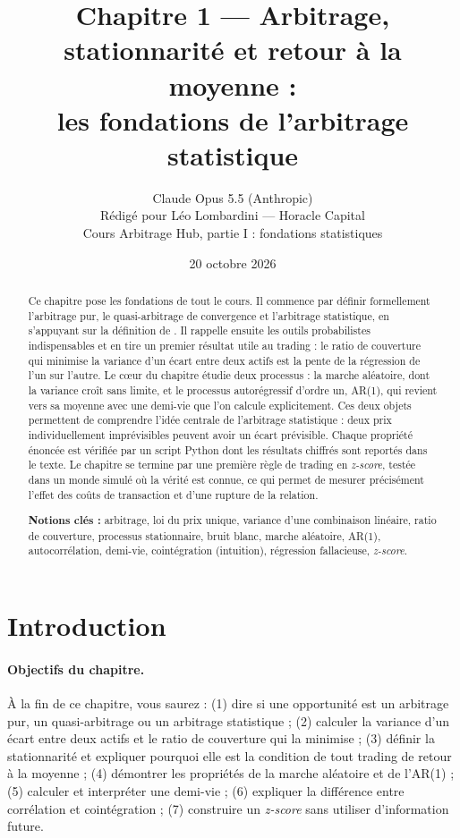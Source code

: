 \documentclass[11pt,a4paper]{article}
\title{\textbf{Chapitre 1 — Arbitrage, stationnarité et retour à la moyenne :\\ les fondations de l'arbitrage statistique}}
\author{Claude Opus 5.5 (Anthropic)\\[0.2em]
\small Rédigé pour Léo Lombardini — Horacle Capital\\
\small Cours \og Arbitrage Hub\fg, partie I : fondations statistiques}
\date{20 octobre 2026}
\begin{document}
\maketitle
\thispagestyle{empty}

\begin{abstract}
\noindent Ce chapitre pose les fondations de tout le cours. Il commence par définir formellement l'arbitrage pur, le quasi-arbitrage de convergence et l'arbitrage statistique, en s'appuyant sur la définition de \citet{hogan2004}. Il rappelle ensuite les outils probabilistes indispensables et en tire un premier résultat utile au trading : le ratio de couverture qui minimise la variance d'un écart entre deux actifs est la pente de la régression de l'un sur l'autre. Le cœur du chapitre étudie deux processus : la marche aléatoire, dont la variance croît sans limite, et le processus autorégressif d'ordre un, AR(1), qui revient vers sa moyenne avec une demi-vie que l'on calcule explicitement. Ces deux objets permettent de comprendre l'idée centrale de l'arbitrage statistique : deux prix individuellement imprévisibles peuvent avoir un écart prévisible. Chaque propriété énoncée est vérifiée par un script Python dont les résultats chiffrés sont reportés dans le texte. Le chapitre se termine par une première règle de trading en \emph{z-score}, testée dans un monde simulé où la vérité est connue, ce qui permet de mesurer précisément l'effet des coûts de transaction et d'une rupture de la relation.

\medskip\noindent\textbf{Notions clés :} arbitrage, loi du prix unique, variance d'une combinaison linéaire, ratio de couverture, processus stationnaire, bruit blanc, marche aléatoire, AR(1), autocorrélation, demi-vie, cointégration (intuition), régression fallacieuse, \emph{z-score}.
\end{abstract}

\tableofcontents
\newpage

\section{Introduction}

\paragraph{Objectifs du chapitre.} À la fin de ce chapitre, vous saurez : (1) dire si une opportunité est un arbitrage pur, un quasi-arbitrage ou un arbitrage statistique ; (2) calculer la variance d'un écart entre deux actifs et le ratio de couverture qui la minimise ; (3) définir la stationnarité et expliquer pourquoi elle est la condition de tout trading de retour à la moyenne ; (4) démontrer les propriétés de la marche aléatoire et de l'AR(1) ; (5) calculer et interpréter une demi-vie ; (6) expliquer la différence entre corrélation et cointégration ; (7) construire un \emph{z-score} sans utiliser d'information future.
\end{document}
